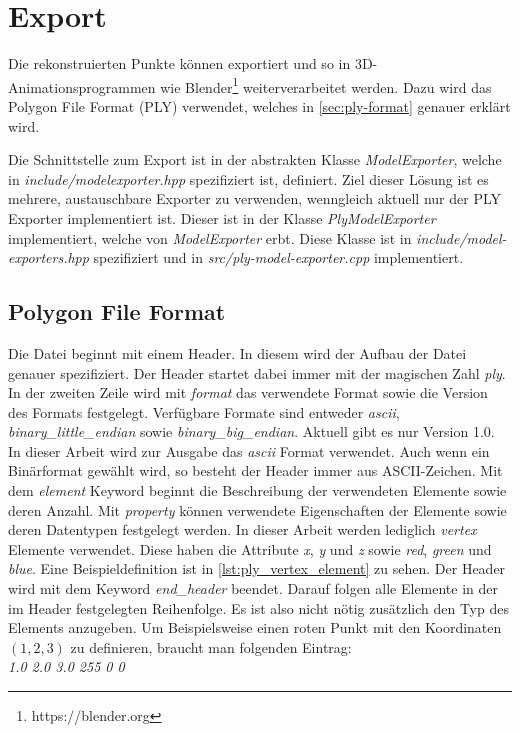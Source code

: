 \section{Export}\label{sec:export}
Die rekonstruierten Punkte können exportiert und so in 3D-Animationsprogrammen wie Blender\footnote{https://blender.org} weiterverarbeitet werden.
Dazu wird das Polygon File Format (PLY) verwendet, welches in \autoref{sec:ply-format} genauer erklärt wird.

Die Schnittstelle zum Export ist in der abstrakten Klasse \emph{ModelExporter}, welche in \emph{include/modelexporter.hpp} spezifiziert ist, definiert.
Ziel dieser Lösung ist es mehrere, austauschbare Exporter zu verwenden, wenngleich aktuell nur der PLY Exporter implementiert ist.
Dieser ist in der Klasse \emph{PlyModelExporter} implementiert, welche von \emph{ModelExporter} erbt.
Diese Klasse ist in \emph{include/model-exporters.hpp} spezifiziert und in \emph{src/ply-model-exporter.cpp} implementiert.


\subsection{Polygon File Format}\label{sec:ply-format}
Die Datei beginnt mit einem Header.
In diesem wird der Aufbau der Datei genauer spezifiziert.
Der Header startet dabei immer mit der magischen Zahl \emph{ply}.
In der zweiten Zeile wird mit \emph{format} das verwendete Format sowie die Version des Formats festgelegt.
Verfügbare Formate sind entweder \emph{ascii}, \emph{binary\_little\_endian} sowie \emph{binary\_big\_endian}.
Aktuell gibt es nur Version 1.0.
In dieser Arbeit wird zur Ausgabe das \emph{ascii} Format verwendet.
Auch wenn ein Binärformat gewählt wird, so besteht der Header immer aus ASCII-Zeichen.
Mit dem \emph{element} Keyword beginnt die Beschreibung der verwendeten Elemente sowie deren Anzahl.
Mit \emph{property} können verwendete Eigenschaften der Elemente sowie deren Datentypen festgelegt werden.
In dieser Arbeit werden lediglich \emph{vertex} Elemente verwendet.
Diese haben die Attribute \emph{x}, \emph{y} und \emph{z} sowie \emph{red}, \emph{green} und \emph{blue}.
Eine Beispieldefinition ist in \autoref{lst:ply_vertex_element} zu sehen.
Der Header wird mit dem Keyword \emph{end\_header} beendet.
Darauf folgen alle Elemente in der im Header festgelegten Reihenfolge.
Es ist also nicht nötig zusätzlich den Typ des Elements anzugeben.
Um Beispielsweise einen roten Punkt mit den Koordinaten $\left(1, 2, 3\right)$ zu definieren, braucht man folgenden Eintrag:\\
\emph{1.0	2.0	3.0	255	0	0}

